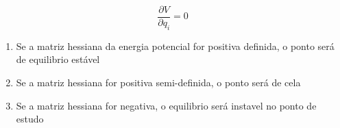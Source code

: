 \begin{namedtheorem}

$$ \boxed{\frac{\partial V}{\partial q_i} = 0} $$

\begin{enumerate}
	\item Se a matriz hessiana da energia potencial for positiva definida, o ponto será de equilibrio estável
	\item Se a matriz hessiana for positiva semi-definida, o ponto será de cela
	\item Se a matriz hessiana for negativa, o equilibrio será instavel no ponto de estudo
\end{enumerate}

\end{namedtheorem}